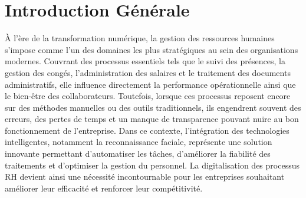 \chapter*{Introduction Générale}
\setlength{\intextsep}{6pt}
\setlength{\textfloatsep}{8pt}
\setlength{\floatsep}{6pt}
\setlength{\abovecaptionskip}{3pt}
\setlength{\belowcaptionskip}{1pt}
\setlength{\LTpre}{3pt}
\setlength{\LTpost}{3pt}

À l’ère de la transformation numérique, la gestion des ressources humaines s’impose comme l’un des domaines les plus stratégiques au sein des organisations modernes. Couvrant des processus essentiels tels que le suivi des présences, la gestion des congés, l’administration des salaires et le traitement des documents administratifs, elle influence directement la performance opérationnelle ainsi que le bien-être des collaborateurs. Toutefois, lorsque ces processus reposent encore sur des méthodes manuelles ou des outils traditionnels, ils engendrent souvent des erreurs, des pertes de temps et un manque de transparence pouvant nuire au bon fonctionnement de l’entreprise. Dans ce contexte, l’intégration des technologies intelligentes, notamment la reconnaissance faciale, représente une solution innovante permettant d’automatiser les tâches, d’améliorer la fiabilité des traitements et d’optimiser la gestion du personnel. La digitalisation des processus RH devient ainsi une nécessité incontournable pour les entreprises souhaitant améliorer leur efficacité et renforcer leur compétitivité.

